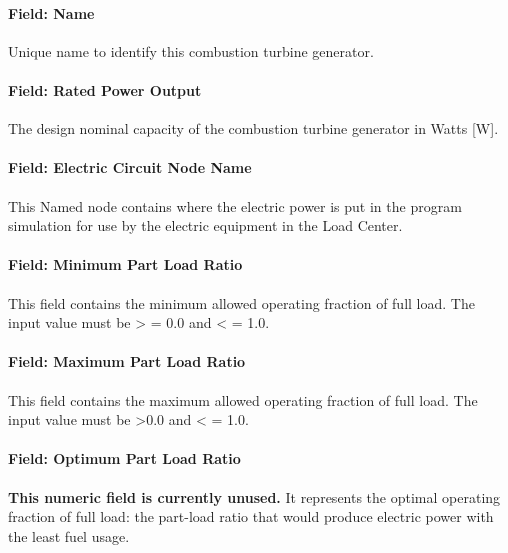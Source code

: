 \paragraph{Field: Name}\label{field-name-9-004}

Unique name to identify this combustion turbine generator.

\paragraph{Field: Rated Power Output}\label{field-rated-power-output-1}

The design nominal capacity of the combustion turbine generator in Watts {[}W{]}.

\paragraph{Field: Electric Circuit Node Name}\label{field-electric-circuit-node-name-1}

This Named node contains where the electric power is put in the program simulation for use by the electric equipment in the Load Center.

\paragraph{Field: Minimum Part Load Ratio}\label{field-minimum-part-load-ratio-1}

This field contains the minimum allowed operating fraction of full load. The input value must be \textgreater{} = 0.0 and \textless{} = 1.0.

\paragraph{Field: Maximum Part Load Ratio}\label{field-maximum-part-load-ratio-1}

This field contains the maximum allowed operating fraction of full load. The input value must be \textgreater{}0.0 and \textless{} = 1.0.

\paragraph{Field: Optimum Part Load Ratio}\label{field-optimum-part-load-ratio-1}

\textbf{This numeric field is currently unused.} It represents the optimal operating fraction of full load: the part-load ratio that would produce electric power with the least fuel usage.

